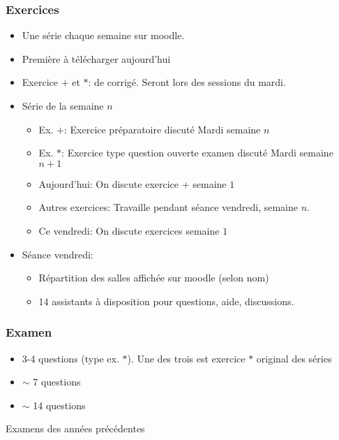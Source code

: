    \begin{frame}
     \frametitle{Exercices}

     \begin{itemize}
     \item Une série chaque semaine sur moodle.
     \item Première à télécharger  aujourd'hui 
     \item Exercice $+$ et $*$:  de corrigé. Seront  lors des sessions du mardi.
     \item Série de la semaine $n$
       \begin{itemize}
       \item Ex. $+$: Exercice préparatoire discuté Mardi semaine $n$
       \item Ex. $*$: Exercice type question ouverte examen   discuté Mardi semaine $n+1$
       \item Aujourd'hui: On discute exercice $+$ semaine $1$
       \item Autres exercices: Travaille pendant séance vendredi, semaine $n$.
       \item Ce vendredi: On discute exercices semaine $1$
       \end{itemize}
     \item Séance vendredi:
       \begin{itemize}
       \item Répartition des salles affichée sur moodle (selon nom)
       \item 14 assistants  à disposition pour questions, aide, discussions. 
       \end{itemize}
       
     \end{itemize}
     
   \end{frame}

   \begin{frame}
     \frametitle{Examen}

     \begin{itemize}
     \item 3-4 questions  (type ex. $*$). Une des trois est exercice $*$ original des séries
     \item $∼$ 7 questions   
     \item  $∼$ 14 questions      
     \end{itemize}

     \bigskip

     Examens des années précédentes  
   \end{frame}

